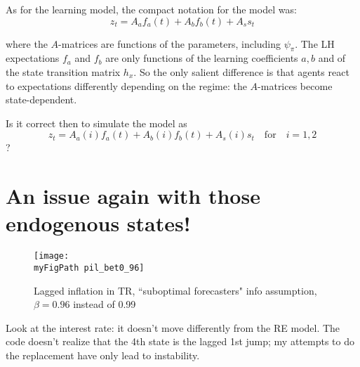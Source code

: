 \documentclass[11pt]{article}
\def \myFigPath {../figures/}
\renewcommand{\[}{\begin{equation}}
\renewcommand{\]}{\end{equation}}
\def\mySmallFigScale{0.22}
\begin{document}
As for the learning model, the compact notation for the model was:
\begin{equation}
z_t  = A_a f_a(t) + A_b f_b(t) + A_s s_t \label{LOM_LR} 
\end{equation}

where the $A$-matrices are functions of the parameters, including $\psi_{\pi}$. The LH expectations $f_a$ and $f_b$ are only functions of the learning coefficients $a,b$ and of the state transition matrix $h_x$. So the only salient difference is that agents react to expectations differently depending on the regime: the $A$-matrices become state-dependent.

Is it correct then to simulate the model as
\begin{equation}
z_t  = A_a(i) f_a(t) + A_b(i) f_b(t) + A_s(i) s_t \quad \text{for} \quad  i=1,2 
\end{equation}
?

\newpage
\section{An issue again with those endogenous states!}

\begin{figure}[h!]
\texttt{[image: \\myFigPath pil\_bet0\_96]}
\caption{ Lagged inflation in TR, ``suboptimal forecasters" info assumption, $\beta = 0.96$ instead of 0.99}
\end{figure}

Look at the interest rate: it doesn't move differently from the RE model. The code doesn't realize that the 4th state is the lagged 1st jump; my attempts to do the replacement have only lead to instability.
\end{document}
